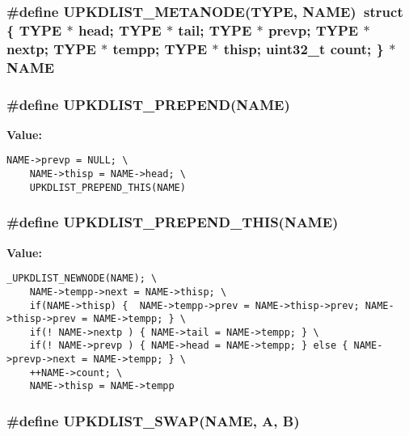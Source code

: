 \subsubsection{\setlength{\rightskip}{0pt plus 5cm}\#define UPKDLIST\_\-METANODE(TYPE, NAME)~struct \{ TYPE $\ast$ head; TYPE $\ast$ tail; TYPE $\ast$ prevp; TYPE $\ast$ nextp; TYPE $\ast$ tempp; TYPE $\ast$ thisp; uint32\_\-t count; \} $\ast$ NAME}\label{types_8h_5acafb1e72aaf5e06082680e83fbdf05}


\subsubsection{\setlength{\rightskip}{0pt plus 5cm}\#define UPKDLIST\_\-PREPEND(NAME)}\label{types_8h_40c3b1f75f52a52d76501ed7ba271a9f}


\textbf{Value:}

\begin{Code}\begin{verbatim}NAME->prevp = NULL; \
    NAME->thisp = NAME->head; \
    UPKDLIST_PREPEND_THIS(NAME)
\end{verbatim}\end{Code}
\subsubsection{\setlength{\rightskip}{0pt plus 5cm}\#define UPKDLIST\_\-PREPEND\_\-THIS(NAME)}\label{types_8h_d0481ef0b0348049ab50d3e50df9c485}


\textbf{Value:}

\begin{Code}\begin{verbatim}_UPKDLIST_NEWNODE(NAME); \
    NAME->tempp->next = NAME->thisp; \
    if(NAME->thisp) {  NAME->tempp->prev = NAME->thisp->prev; NAME->thisp->prev = NAME->tempp; } \
    if(! NAME->nextp ) { NAME->tail = NAME->tempp; } \
    if(! NAME->prevp ) { NAME->head = NAME->tempp; } else { NAME->prevp->next = NAME->tempp; } \
    ++NAME->count; \
    NAME->thisp = NAME->tempp
\end{verbatim}\end{Code}
\subsubsection{\setlength{\rightskip}{0pt plus 5cm}\#define UPKDLIST\_\-SWAP(NAME, A, B)}\label{types_8h_7c05871988031a3761120c008bb42f7a}



